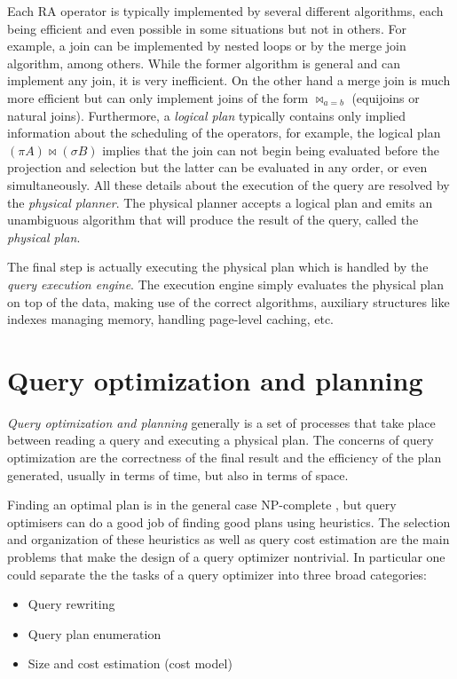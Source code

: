 Each RA operator is typically implemented by several different
algorithms, each being efficient and even possible in some situations
but not in others. For example, a join can be implemented by nested
loops or by the merge join algorithm, among others.  While the former algorithm is
general and can implement any join, it is very inefficient. On the
other hand a merge join is much more efficient but can only implement
joins of the form \(\Join_{a=b}\) (equijoins or natural
joins). Furthermore, a \emph{logical plan} typically contains only
implied information about the scheduling of the operators, for
example, the logical plan \((\pi A) \Join (\sigma B)\) implies that
the join can not begin being evaluated before the projection and
selection but the latter can be evaluated in any order, or even
simultaneously. All these details about the execution
of the query are resolved by the \emph{physical planner}. The physical
planner accepts a logical plan and emits an unambiguous algorithm that
will produce the result of the query, called the \emph{physical plan}.

The final step is actually executing the physical plan which is
handled by the \emph{query execution engine}. The execution engine
simply evaluates the physical plan on top of the data, making use of
the correct algorithms, auxiliary structures like indexes managing
memory, handling page-level caching, etc.

\section{Query optimization and planning}

\emph{Query optimization and planning} generally is a set of processes that
take place between reading a query and executing a physical plan. The
concerns of query optimization are the correctness of the final result and
the efficiency of the plan generated, usually in terms of time, but
also in terms of space.

Finding an optimal plan is in the general case NP-complete
\cite{ullmanInformationIntegrationUsing1997}, but query optimisers can
do a good job of finding good plans using heuristics. The selection
and organization of these heuristics as well as query cost estimation
are the main problems that make the design of a query optimizer nontrivial. In
particular one could separate the the tasks of a query optimizer
into three broad categories:

\begin{itemize}
\item Query rewriting
\item Query plan enumeration
\item Size and cost estimation (cost model)
\end{itemize}


